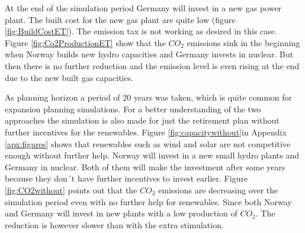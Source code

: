 \documentclass{article}
\begin{document}
\begin{itemize}
At the end of the simulation period Germany will invest in a new gas power plant. The built cost for the new gas plant are quite low (figure \ref{fig:BuildCostET}). The emission tax is not working as desired in this case. Figure \ref{fig:Co2ProductionET} show that the $CO_2$ emissions sink in the beginning when Norway builds new hydro capacities and Germany invests in nuclear. But then there is no further reduction and the emission level is even rising at the end due to the new built gas capacities.
\end{itemize}
As planning horizon a period of 20 years was taken, which is quite common for expansion planning simulations. For a better understanding of the two approaches the simulation is also made for just the retirement plan without further incentives for the renewables. Figure \ref{fig:capacitywithout}in Appendix  \ref{apx:figures} shows that renewables such as wind and solar are not competitive enough without further help.  Norway will invest in a new small hydro plants and Germany in nuclear. Both of them will make the investment after some years because they don´t have further incentives to invest earlier. Figure \ref{fig:CO2without} points out that the $CO_2$ emissions are decreasing over the simulation period even with no further help for renewables. Since both Norway and Germany will invest in new plants with a low production of $CO_2$. The reduction is however slower than with the extra stimulation.
\end{document}
